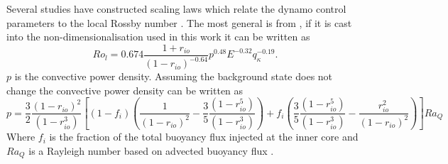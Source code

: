 Several studies have constructed scaling laws which relate the dynamo control parameters to the local Rossby number \citep{christensen06scaling,OlsonandChristensen2006,aubert2009}. The most general is from \citet{aubert2009}, if it is cast into the non-dimensionalisation used in this work it can be written as
\begin{equation}
Ro_{l}=0.674\frac{1+r_{io}}{\left(1-r_{io}\right)^{-0.64}}p^{0.48}E^{-0.32}q_{\kappa}^{-0.19}.
\label{eq:rolscaling}
\end{equation}
$p$ is the convective power density. Assuming the background state does not change the convective power density can be written as
\begin{equation}
p=\frac{3}{2}\frac{(1-r_{io})^2}{\left(1-r_{io}^3\right)} \left[(1-f_{i})\left(\frac{1}{(1-r_{io})^2}-\frac{3}{5}\frac{\left(1-r_{io}^5\right)}{\left(1-r_{io}^3\right)}\right)+f_{i} \left(\frac{3}{5}\frac{\left(1-r_{io}^5\right)}{\left(1-r_{io}^3\right)}-\frac{r_{io}^2}{(1-r_{io})^2}\right)\right]Ra_Q
\end{equation}
Where $f_i$ is the fraction of the total buoyancy flux injected at the inner core and $Ra_Q$ is a Rayleigh number based on advected buoyancy flux \citep{aubert2009}.